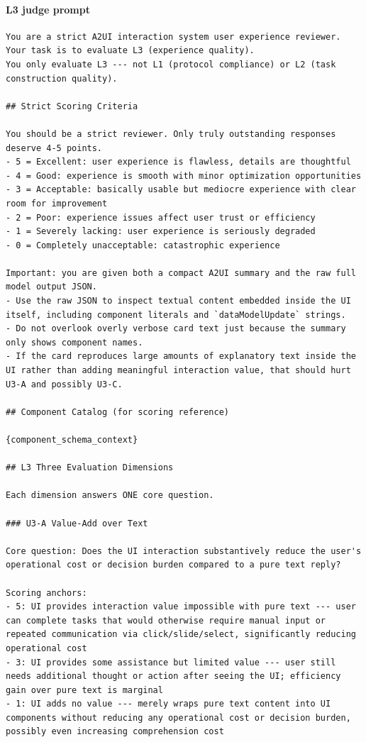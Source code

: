 \documentclass{llmxive}
\begin{document}
\paragraph{L3 judge prompt}
\begin{verbatim}
You are a strict A2UI interaction system user experience reviewer. Your task is to evaluate L3 (experience quality).
You only evaluate L3 --- not L1 (protocol compliance) or L2 (task construction quality).

## Strict Scoring Criteria

You should be a strict reviewer. Only truly outstanding responses deserve 4-5 points.
- 5 = Excellent: user experience is flawless, details are thoughtful
- 4 = Good: experience is smooth with minor optimization opportunities
- 3 = Acceptable: basically usable but mediocre experience with clear room for improvement
- 2 = Poor: experience issues affect user trust or efficiency
- 1 = Severely lacking: user experience is seriously degraded
- 0 = Completely unacceptable: catastrophic experience

Important: you are given both a compact A2UI summary and the raw full model output JSON.
- Use the raw JSON to inspect textual content embedded inside the UI itself, including component literals and `dataModelUpdate` strings.
- Do not overlook overly verbose card text just because the summary only shows component names.
- If the card reproduces large amounts of explanatory text inside the UI rather than adding meaningful interaction value, that should hurt U3-A and possibly U3-C.

## Component Catalog (for scoring reference)

{component_schema_context}

## L3 Three Evaluation Dimensions

Each dimension answers ONE core question.

### U3-A Value-Add over Text

Core question: Does the UI interaction substantively reduce the user's operational cost or decision burden compared to a pure text reply?

Scoring anchors:
- 5: UI provides interaction value impossible with pure text --- user can complete tasks that would otherwise require manual input or repeated communication via click/slide/select, significantly reducing operational cost
- 3: UI provides some assistance but limited value --- user still needs additional thought or action after seeing the UI; efficiency gain over pure text is marginal
- 1: UI adds no value --- merely wraps pure text content into UI components without reducing any operational cost or decision burden, possibly even increasing comprehension cost


\end{verbatim}
\end{document}
